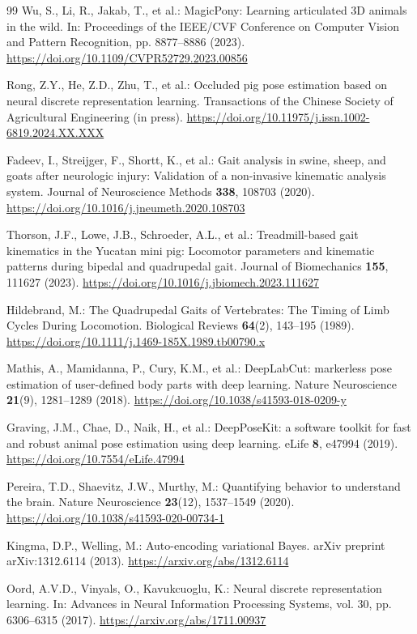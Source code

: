 \documentclass[runningheads]{llncs}
\begin{document}
\begin{thebibliography}{99}
Wu, S., Li, R., Jakab, T., et al.: MagicPony: Learning articulated 3D animals in the wild. In: Proceedings of the IEEE/CVF Conference on Computer Vision and Pattern Recognition, pp. 8877--8886 (2023). \url{https://doi.org/10.1109/CVPR52729.2023.00856}

Rong, Z.Y., He, Z.D., Zhu, T., et al.: Occluded pig pose estimation based on neural discrete representation learning. Transactions of the Chinese Society of Agricultural Engineering (in press). \url{https://doi.org/10.11975/j.issn.1002-6819.2024.XX.XXX}

Fadeev, I., Streijger, F., Shortt, K., et al.: Gait analysis in swine, sheep, and goats after neurologic injury: Validation of a non-invasive kinematic analysis system. Journal of Neuroscience Methods \textbf{338}, 108703 (2020). \url{https://doi.org/10.1016/j.jneumeth.2020.108703}

Thorson, J.F., Lowe, J.B., Schroeder, A.L., et al.: Treadmill-based gait kinematics in the Yucatan mini pig: Locomotor parameters and kinematic patterns during bipedal and quadrupedal gait. Journal of Biomechanics \textbf{155}, 111627 (2023). \url{https://doi.org/10.1016/j.jbiomech.2023.111627}

Hildebrand, M.: The Quadrupedal Gaits of Vertebrates: The Timing of Limb Cycles During Locomotion. Biological Reviews \textbf{64}(2), 143--195 (1989). \url{https://doi.org/10.1111/j.1469-185X.1989.tb00790.x}

Mathis, A., Mamidanna, P., Cury, K.M., et al.: DeepLabCut: markerless pose estimation of user-defined body parts with deep learning. Nature Neuroscience \textbf{21}(9), 1281--1289 (2018). \url{https://doi.org/10.1038/s41593-018-0209-y}

Graving, J.M., Chae, D., Naik, H., et al.: DeepPoseKit: a software toolkit for fast and robust animal pose estimation using deep learning. eLife \textbf{8}, e47994 (2019). \url{https://doi.org/10.7554/eLife.47994}

Pereira, T.D., Shaevitz, J.W., Murthy, M.: Quantifying behavior to understand the brain. Nature Neuroscience \textbf{23}(12), 1537--1549 (2020). \url{https://doi.org/10.1038/s41593-020-00734-1}

Kingma, D.P., Welling, M.: Auto-encoding variational Bayes. arXiv preprint arXiv:1312.6114 (2013). \url{https://arxiv.org/abs/1312.6114}

Oord, A.V.D., Vinyals, O., Kavukcuoglu, K.: Neural discrete representation learning. In: Advances in Neural Information Processing Systems, vol. 30, pp. 6306--6315 (2017). \url{https://arxiv.org/abs/1711.00937}

\end{thebibliography}
\end{document}
